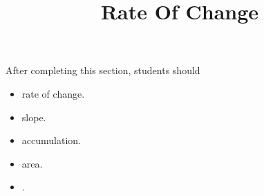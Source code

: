\documentclass{ximera}
\title{Rate Of Change}
\begin{document}
\begin{abstract}
\end{abstract}
\maketitle

\begin{sectionOutcomes}
After completing this section, students should 

\begin{itemize}
\item rate of change.
\item slope.
\item accumulation.
\item area.
\item .
\end{itemize}
\end{sectionOutcomes}
\end{document}
